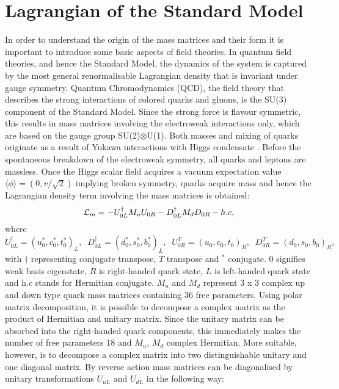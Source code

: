 \section{Lagrangian of the Standard Model}
In order to understand the origin of the mass matrices and their form it is important to introduce some basic aspects of field theories. In quantum field theories, and hence the Standard Model, the dynamics of the system is captured by the most general renormalisable Lagrangian density that is invariant under gauge symmetry. Quantum Chromodynamics (QCD), the field theory that describes the strong interactions of colored quarks and gluons, is the SU(3) component of the Standard Model. Since the strong force is flavour symmetric, this results in mass matrices involving the electroweak interactions only, which are based on the gauge group SU(2)$\otimes$U(1). Both masses and mixing of quarks originate as a result of Yukawa interactions with Higgs condensate \cite{ewconstraint}. Before the spontaneous breakdown of the electroweak symmetry, all quarks and leptons are massless. Once the Higgs scalar field acquires a vacuum expectation value $\langle\phi\rangle = (0, v/\sqrt{2})$ implying broken symmetry, quarks acquire mass and hence the Lagrangian density term involving the mass matrices\cite{texture} is obtained: 
\begin{equation}\label{lama}
{\cal L}_m= -U_{0L}^{\dagger}M_u U_{0R} - D_{0L}^{\dagger}M_dD_{0R} - h.c,
\end{equation}
where $U_{0L}^{\dagger}=(u_0^{*}, c_0^{*}, t_0^{*})_L,\;\; D_{0L}^{\dagger}=(d_0^{*},s_0^{*}, b_0^{*})_L,\;\; U_{0R}^T=(u_0,c_0,t_0)_R,\;\;D_{0R}^T=(d_0,s_0,b_0)_R,$ with $\dagger$ representing conjugate transpose, $T$ transpose and $^{*}$ conjugate. $0$ signifies weak basis eigenstate, $R$ is right-handed quark state, $L$ is left-handed quark state and h.c stands for Hermitian conjugate. $M_{u}$ and $M_{d}$ represent 3 x 3 complex up and down type quark mass matrices containing 36 free parameters. Using polar matrix decomposition, it is possible to decompose  a complex matrix as the product of Hermitian and unitary matrix. Since the unitary matrix can be absorbed into the right-handed quark components, this immediately makes the number of free parameters 18 and $M_{u}$, $M_{d}$  complex Hermitian.
\newline
\indent More suitable, however, is to decompose a complex matrix into two distinguishable unitary and one diagonal matrix. By reverse action mass matrices can be diagonalised by unitary transformations $U_{uL}$ and $ U_{dL}$ in the following way:

